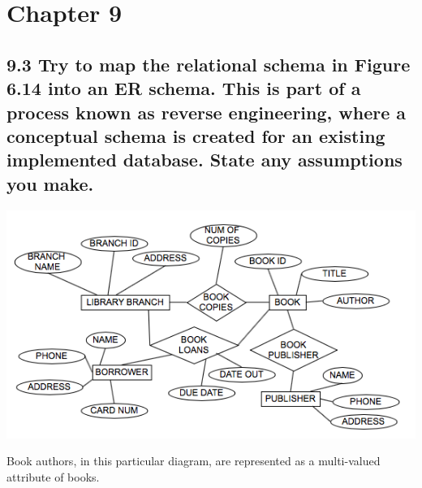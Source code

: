 \section*{Chapter 9}


\subsection*{9.3 Try to map the relational schema in Figure 6.14 into an ER schema. This is part of a process known as reverse engineering, where a conceptual schema is created for an existing implemented database. State any assumptions you make.}
\begin{center}
\includegraphics[width=15cm]{images/9-3.png}
\end{center}

Book authors, in this particular diagram, are represented as a multi-valued attribute of books.